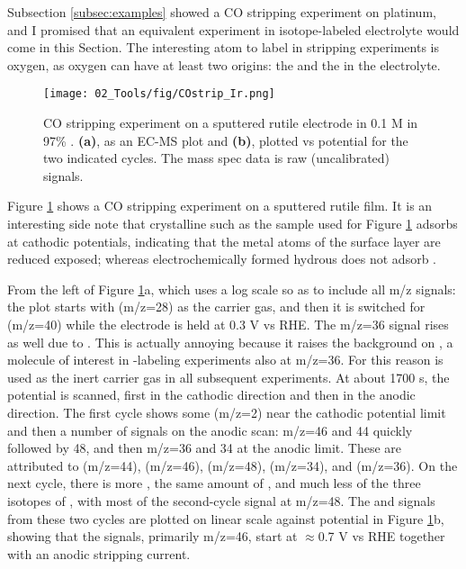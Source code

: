 Subsection \ref{subsec:examples} showed a CO stripping experiment on platinum, and I promised that an equivalent experiment in isotope-labeled electrolyte would come in this Section. The interesting atom to label in  stripping experiments is oxygen, as oxygen can have at least two origins: the  and the  in the electrolyte.

\begin{figure}[h!]
	\centering
	\texttt{[image: 02\_Tools/fig/COstrip\_Ir.png]}
	\caption{CO stripping experiment on a sputtered rutile  electrode in 0.1 M  in 97\% . \textbf{(a)}, as an EC-MS plot and \textbf{(b)}, plotted vs potential for the two indicated cycles. The mass spec data is raw (uncalibrated) signals.}
	\label{fig:IrO2_COstrip}
\end{figure}

Figure \ref{fig:IrO2_COstrip} shows a CO stripping experiment on a sputtered rutile  film. It is an interesting side note that crystalline  such as the sample used for Figure \ref{fig:IrO2_COstrip} adsorbs  at cathodic potentials, indicating that the metal atoms of the surface layer are reduced exposed; whereas electrochemically formed hydrous  does not adsorb . 

From the left of Figure \ref{fig:IrO2_COstrip}a, which uses a log scale so as to include all m/z signals: the plot starts with  (m/z=28) as the carrier gas, and then it is switched for  (m/z=40) while the electrode is held at 0.3 V vs RHE. The m/z=36 signal rises as well due to . This is actually annoying because it raises the background on , a molecule of interest in -labeling experiments also at m/z=36. For this reason  is used as the inert carrier gas in all subsequent  experiments. At about 1700 s, the potential is scanned, first in the cathodic direction and then in the anodic direction. The first cycle shows some  (m/z=2) near the cathodic potential limit and then a number of signals on the anodic scan: m/z=46 and 44 quickly followed by 48, and then m/z=36 and 34 at the anodic limit. These are attributed to  (m/z=44),  (m/z=46),  (m/z=48),  (m/z=34), and  (m/z=36). On the next cycle, there is more , the same amount of , and much less of the three isotopes of , with most of the second-cycle  signal at m/z=48. The  and  signals from these two cycles are plotted on linear scale against potential in Figure \ref{fig:IrO2_COstrip}b, showing that the  signals, primarily m/z=46, start at $\approx$0.7 V vs RHE together with an anodic stripping current. 
	
